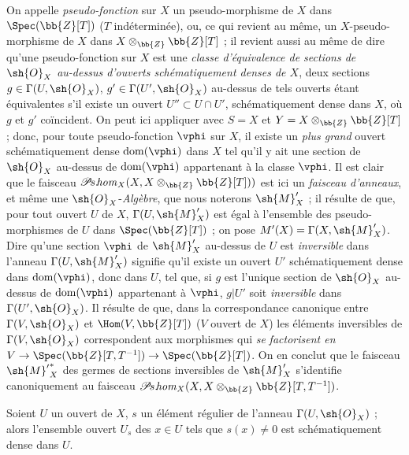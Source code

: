 \begin{env}[20.2.8]
On appelle \emph{pseudo-fonction} sur $X$ un pseudo-morphisme de $X$ dans $\Spec(\bb{Z}[T])$ ($T$ indéterminée), ou, ce qui revient au même, un $X$-pseudo-morphisme de $X$ dans $X\otimes_{\bb{Z}}\bb{Z}[T]$ ; il revient aussi au même  de dire qu'une pseudo-fonction sur $X$ est une \emph{classe d'équivalence de sections de $\sh{O}_X$ au-dessus d'ouverts schématiquement denses de $X$}, deux sections $g\in\Gamma(U,\sh{O}_X)$, $g'\in\Gamma(U',\sh{O}_X)$ au-dessus de tels ouverts étant équivalentes s'il existe un ouvert $U''\subset U\cap U'$, schématiquement dense dans $X$, où $g$ et $g'$ coïncident.
On peut ici appliquer  avec $S=X$ et $Y=X\otimes_{\bb{Z}}\bb{Z}[T]$ ; donc, pour toute pseudo-fonction $\vphi$ sur $X$, il existe un \emph{plus grand} ouvert schématiquement dense $\operatorname{dom}(\vphi)$ dans $X$ tel qu'il y ait une section de $\sh{O}_X$ au-dessus de $\operatorname{dom}(\vphi)$ appartenant à la classe $\vphi$.
Il est clair que le faisceau $\mathscr{P}\!s.\!\mathit{hom}_X(X,X\otimes_{\bb{Z}}\bb{Z}[T]))$ est ici un \emph{faisceau d'anneaux}, et même une $\sh{O}_X$-\emph{Algèbre}, que nous noterons $\sh{M}'_X$ ; il résulte de  que, pour tout ouvert $U$ de $X$, $\Gamma(U,\sh{M}'_X)$ est égal à l'ensemble des pseudo-morphismes de $U$ dans $\Spec(\bb{Z}[T])$ ; on pose $M'(X)=\Gamma(X,\sh{M}'_X)$.
Dire qu'une section $\vphi$ de $\sh{M}'_X$ au-dessus de $U$ est \emph{inversible} dans l'anneau $\Gamma(U,\sh{M}'_X)$ signifie qu'il existe un ouvert $U'$ schématiquement dense dans $\operatorname{dom}(\vphi)$, donc dans $U$, tel que, si $g$ est l'unique section de $\sh{O}_X$ au-dessus de $\operatorname{dom}(\vphi)$ appartenant à $\vphi$, $g|U'$ soit \emph{inversible} dans $\Gamma(U',\sh{O}_X)$.
Il résulte de  que, dans la correspondance canonique entre $\Gamma(V,\sh{O}_X)$ et $\Hom(V,\bb{Z}[T])$ ($V$ ouvert de $X$) les éléments inversibles de $\Gamma(V,\sh{O}_X)$ correspondent aux morphismes qui \emph{se}
\emph{factorisent en} $V\to\Spec(\bb{Z}[T,T^{-1}])\to\Spec(\bb{Z}[T])$.
On en conclut que le faisceau ${\sh{M}'}^*_X$ des germes de sections inversibles de $\sh{M}'_X$ s'identifie canoniquement au faisceau $\mathscr{P}\!s.\!\mathit{hom}_X(X,X\otimes_{\bb{Z}}\bb{Z}[T,T^{-1}])$.
\end{env}

\begin{lemma}[20.2.9]
\label{IV.20.2.9}
Soient $U$ un ouvert de $X$, $s$ un élément régulier de l'anneau $\Gamma(U,\sh{O}_X)$ ; alors l'ensemble ouvert $U_s$ des $x\in U$ tels que $s(x)\neq0$ est schématiquement dense dans $U$.
\end{lemma}

